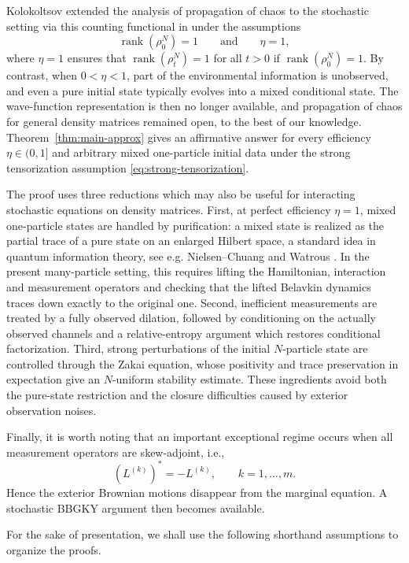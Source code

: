 \documentclass[10pt,a4paper,reqno]{amsart}
\numberwithin{equation}{section}
\theoremstyle{plain}
\theoremstyle{definition}
\theoremstyle{remark}
\newcommand{\1}{\mathbf 1}
\begin{document}
Kolokoltsov extended the analysis of propagation of chaos to the stochastic setting via this counting functional in
\citep{kolokoltsov2021,kolokoltsov2022} under the assumptions
\[
  \operatorname{rank}(\rho_0^N)=1
  \qquad \mbox{and}\qquad 
  \eta=1,
\]
where  \(\eta=1\) ensures that $\operatorname{rank}(\rho_t^N)=1$ for all $t>0$ if $ \operatorname{rank}(\rho_0^N)=1$.   By contrast, when
\(0<\eta<1\), part of the environmental information is unobserved, and even a
pure initial state typically evolves into a mixed conditional state.  The
wave-function representation is then no longer available, and propagation of
chaos for general density matrices remained open, to the best of our knowledge.
Theorem~\ref{thm:main-approx} gives an affirmative answer for every efficiency
\(\eta\in(0,1]\) and arbitrary mixed one-particle initial data under the strong
tensorization assumption \eqref{eq:strong-tensorization}.

The proof uses three reductions which may also be useful for interacting
stochastic equations on density matrices.  First, at perfect efficiency
\(\eta=1\), mixed one-particle states are handled by purification: a mixed
state is realized as the partial trace of a pure state on an enlarged Hilbert
space,  a standard idea in quantum information theory, see e.g. Nielsen--Chuang
\cite{nielsenchuang2010} and Watrous \cite{watrous2018}.  In the present
many-particle setting, this requires lifting the Hamiltonian, interaction and
measurement operators and checking that the lifted Belavkin dynamics traces
down exactly to the original one.  Second, inefficient measurements are treated
by a fully observed dilation, followed by conditioning on the actually observed
channels and a relative-entropy argument which restores conditional
factorization.  Third, strong perturbations of the initial \(N\)-particle
state are controlled through the  Zakai equation, whose positivity and
trace preservation in expectation give an \(N\)-uniform stability estimate.
These ingredients avoid both the pure-state restriction and the closure
difficulties caused by exterior observation noises.

Finally, it is worth noting that an important exceptional regime occurs when
all measurement operators are skew-adjoint,  i.e.,
\[
  (L^{(k)})^*=-L^{(k)},
  \qquad
  k=1,\ldots,m.
\]
Hence the exterior Brownian motions disappear from the marginal equation.  A
stochastic BBGKY argument then becomes available.  

\medskip

For the sake of presentation, we shall use the following shorthand assumptions
to organize the proofs.
\end{document}

